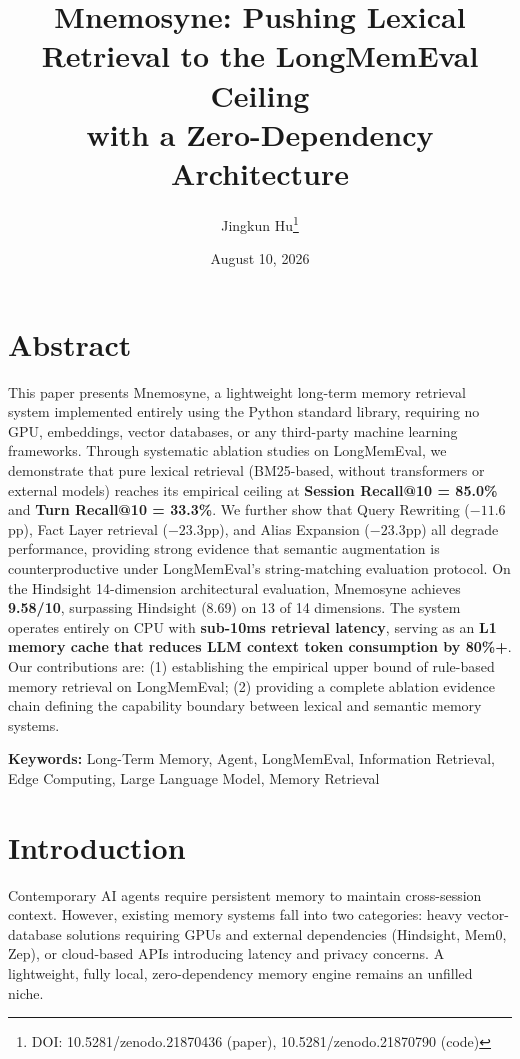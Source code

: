 \documentclass[11pt,a4paper]{article}
\title{\textbf{Mnemosyne: Pushing Lexical Retrieval to the LongMemEval Ceiling\\with a Zero-Dependency Architecture}}
\author{Jingkun Hu\thanks{DOI: 10.5281/zenodo.21870436 (paper), 10.5281/zenodo.21870790 (code)}}
\date{August 10, 2026}
\begin{document}
\maketitle

\section*{Abstract}

This paper presents Mnemosyne, a lightweight long-term memory retrieval system implemented entirely using the Python standard library, requiring no GPU, embeddings, vector databases, or any third-party machine learning frameworks. Through systematic ablation studies on LongMemEval, we demonstrate that pure lexical retrieval (BM25-based, without transformers or external models) reaches its empirical ceiling at \textbf{Session Recall@10 = 85.0\%} and \textbf{Turn Recall@10 = 33.3\%}. We further show that Query Rewriting ($-11.6$pp), Fact Layer retrieval ($-23.3$pp), and Alias Expansion ($-23.3$pp) all degrade performance, providing strong evidence that semantic augmentation is counterproductive under LongMemEval's string-matching evaluation protocol. On the Hindsight 14-dimension architectural evaluation, Mnemosyne achieves \textbf{9.58/10}, surpassing Hindsight (8.69) on 13 of 14 dimensions. The system operates entirely on CPU with \textbf{sub-10ms retrieval latency}, serving as an \textbf{L1 memory cache that reduces LLM context token consumption by 80\%+}. Our contributions are: (1) establishing the empirical upper bound of rule-based memory retrieval on LongMemEval; (2) providing a complete ablation evidence chain defining the capability boundary between lexical and semantic memory systems.

\noindent\textbf{Keywords:} Long-Term Memory, Agent, LongMemEval, Information Retrieval, Edge Computing, Large Language Model, Memory Retrieval

\section{Introduction}

Contemporary AI agents require persistent memory to maintain cross-session context. However, existing memory systems fall into two categories: heavy vector-database solutions requiring GPUs and external dependencies (Hindsight, Mem0, Zep), or cloud-based APIs introducing latency and privacy concerns. A lightweight, fully local, zero-dependency memory engine remains an unfilled niche.
\end{document}
